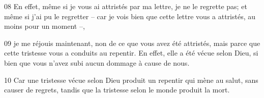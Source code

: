 
08 En effet, même si je vous ai attristés par ma lettre, je ne le regrette pas; et même si j’ai pu le regretter – car je vois bien que cette lettre vous a attristés, au moins pour un moment –,

09 je me réjouis maintenant, non de ce que vous avez été attristés, mais parce que cette tristesse vous a conduits au repentir. En effet, elle a été vécue selon Dieu, si bien que vous n’avez subi aucun dommage à cause de nous.

10 Car une tristesse vécue selon Dieu produit un repentir qui mène au salut, sans causer de regrets, tandis que la tristesse selon le monde produit la mort.